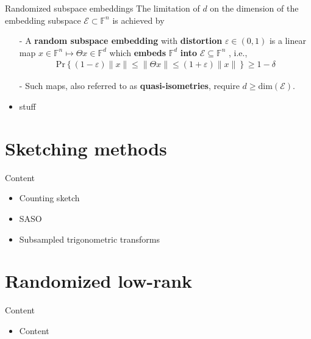 \documentclass[t,usepdftitle=false]{beamer}
\begin{document}
\begin{frame}{Randomized subspace embeddings}
The limitation of $d$ on the dimension of the embedding subspace $\mathcal{E}\subset \mathbb{F}^n$ is achieved by 
\begin{definition}
\begin{itemize}
\item[-] A \textbf{random subspace embedding} with \textbf{distortion} $\varepsilon\in(0,1)$ is a linear map $x\in\mathbb{F}^n\mapsto \Theta x\in\mathbb{F}^d$
which \textbf{embeds} $\mathbb{F}^d$ \textbf{into} $\mathcal{E}\subseteq\mathbb{F}^n$ , i.e.,
\begin{align*}
\mathrm{Pr}
\left\{
(1-\varepsilon)\|x\|\leq \|\Theta x\|\leq (1+\varepsilon)\|x\|
\right\}\geq 1-\delta
\end{align*}
\item[-] Such maps, also referred to as \textbf{quasi-isometries}, require $d\geq \mathrm{dim}(\mathcal{E})$.
\end{itemize}
\end{definition}
\begin{itemize}
\item stuff
\end{itemize}
\end{frame}


\section{Sketching methods}

\begin{frame}{Content}
\begin{itemize}
\item Counting sketch
\item SASO
\item Subsampled trigonometric transforms
\end{itemize}
\end{frame}

\section{Randomized low-rank}

\begin{frame}{Content}
\begin{itemize}
\item Content
\end{itemize}
\end{frame}
\end{document}
